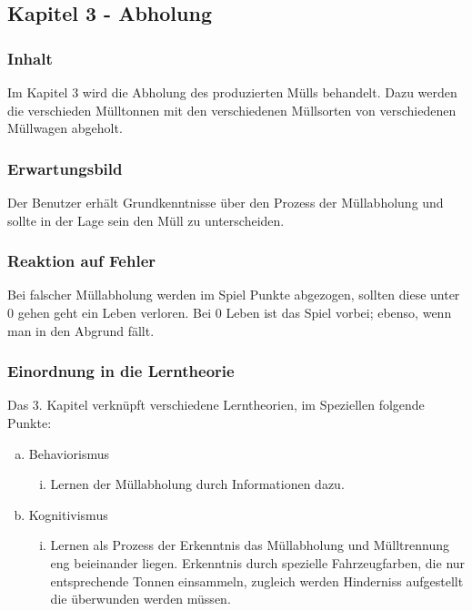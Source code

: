 \documentclass[a4paper]{article}
\begin{document}
    \subsection{Kapitel 3 - Abholung}
        \subsubsection{Inhalt}
            Im Kapitel 3 wird die Abholung des produzierten Mülls behandelt. Dazu werden die verschieden Mülltonnen mit den verschiedenen Müllsorten von verschiedenen Müllwagen abgeholt.
        \subsubsection{Erwartungsbild}
            Der Benutzer erhält Grundkenntnisse über den Prozess der Müllabholung und sollte in der Lage sein den Müll zu unterscheiden.
        \subsubsection{Reaktion auf Fehler}
            Bei falscher Müllabholung werden im Spiel Punkte abgezogen, sollten diese unter 0 gehen geht ein Leben verloren. Bei 0 Leben ist das Spiel vorbei; ebenso, wenn man in den Abgrund fällt.
        \subsubsection{Einordnung in die Lerntheorie}
            Das 3. Kapitel verknüpft verschiedene Lerntheorien, im Speziellen folgende Punkte:
            \begin{enumerate}[(a)]
                \item Behaviorismus
                \begin{enumerate}[(i)]
                    \item Lernen der Müllabholung durch Informationen dazu.
                \end{enumerate}

                \item Kognitivismus
                \begin{enumerate}[(i)]
                    \item Lernen als Prozess der Erkenntnis das Müllabholung und Mülltrennung eng beieinander liegen. Erkenntnis durch spezielle Fahrzeugfarben, die nur entsprechende Tonnen einsammeln, zugleich werden Hinderniss aufgestellt die überwunden werden müssen.
                \end{enumerate}
            \end{enumerate}
\end{document}
